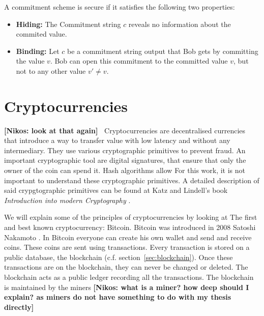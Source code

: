 \documentclass{cacthesis}
\newcommand{\authnote}[3]{{ \footnotesize \textbf{#1[#2: #3]~}}}
\newcommand{\niknote}[1]{\authnote{\color{red}}{Nikos}{#1}}
\begin{document}
 A commitment scheme is secure if it satisfies the following two properties:
 \begin{itemize}
     \item \textbf{Hiding:} The Commitment string $c$ reveals no information about the commited value\cite{boneh_graduate_nodate}.
     \item \textbf{Binding:} Let $c$ be a commitment string output that Bob gets by committing the value $v$. Bob can open this commitment to the committed value $v$, but not to any other value $v'\neq v$.
 \end{itemize}
\section{Cryptocurrencies}
\niknote{look at that again}
Cryptocurrencies are decentralised currencies that introduce a way to transfer value with low latency and without any intermediary. They use various cryptographic primitives to prevent fraud. An important cryptographic tool are digital signatures, that ensure that only the owner of the coin can spend it. Hash algorithms allow For this work, it is not important to understand these cryptographic primitives. A detailed description of said crypgtographic primitives can be found at Katz and Lindell's book \emph{Introduction into modern Cryptography} \cite{Katz2020-aj}. 

We will explain some of the principles of cryptocurrencies by looking at The first and best known cryptocurrency: Bitcoin. Bitcoin was introduced in 2008 Satoshi Nakamoto \cite{nakamoto_bitcoin_nodate}. In Bitcoin everyone can create his own wallet and send and receive coins. These coins are sent using transactions. Every transaction is stored on a public database, the blockchain (c.f. section~\ref{sec:blockchain}). Once these transactions are on the blockchain, they can never be changed or deleted. The blockchain acts as a public ledger recording all the transactions. The blockchain is maintained by the miners \niknote{what is a miner? how deep should I explain? as miners do not have something to do with my thesis directly} \newline
\end{document}
